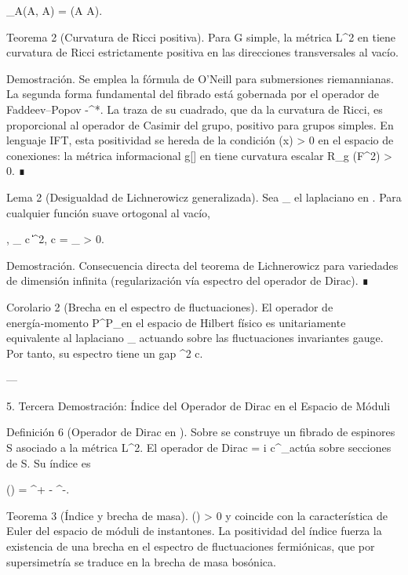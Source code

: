 \documentclass[12pt,twoside]{book}
\begin{document}
_A(\delta A, \delta A) = \int {}(\delta A \wedge * \delta A).

Teorema 2 (Curvatura de Ricci positiva). Para G simple, la métrica L^2 en  tiene curvatura de Ricci estrictamente positiva en las direcciones transversales al vacío.

Demostración. Se emplea la fórmula de O’Neill para submersiones riemannianas. La segunda forma fundamental del fibrado  \to {} está gobernada por el operador de Faddeev–Popov -\nabla^*\nabla. La traza de su cuadrado, que da la curvatura de Ricci, es proporcional al operador de Casimir del grupo, positivo para grupos simples. En lenguaje IFT, esta positividad se hereda de la condición \rho(x) > 0 en el espacio de conexiones: la métrica informacional g[\rho] en  tiene curvatura escalar R_{g} \propto {}(F^2) > 0. ∎

Lema 2 (Desigualdad de Lichnerowicz generalizada). Sea \Delta_{} el laplaciano en . Para cualquier función suave \psi ortogonal al vacío,

\langle \psi, \Delta_{} \psi \rangle \ge c \|\psi\|^2, \quad c = \inf {}_{} > 0.

Demostración. Consecuencia directa del teorema de Lichnerowicz para variedades de dimensión infinita (regularización vía espectro del operador de Dirac). ∎

Corolario 2 (Brecha en el espectro de fluctuaciones). El operador de energía‑momento P^\mu P_\mu en el espacio de Hilbert físico es unitariamente equivalente al laplaciano \Delta_{} actuando sobre las fluctuaciones invariantes gauge. Por tanto, su espectro tiene un gap \Delta^2 \ge c.

---

5. Tercera Demostración: Índice del Operador de Dirac en el Espacio de Móduli

Definición 6 (Operador de Dirac en ). Sobre  se construye un fibrado de espinores S asociado a la métrica L^2. El operador de Dirac  = i c^\mu \nabla_\mu actúa sobre secciones de S. Su índice es

() = \dim \ker {}^+ - \dim \ker {}^-.

Teorema 3 (Índice y brecha de masa). () > 0 y coincide con la característica de Euler del espacio de móduli de instantones. La positividad del índice fuerza la existencia de una brecha en el espectro de fluctuaciones fermiónicas, que por supersimetría se traduce en la brecha de masa bosónica.
\end{document}
